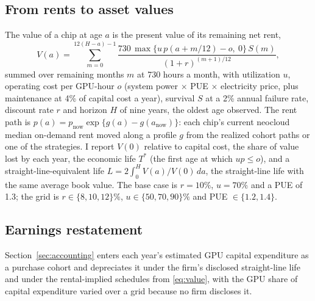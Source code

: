 \subsection{From rents to asset values}

The value of a chip at age $a$ is the present value of its remaining net rent,
\begin{equation}
V(a) = \sum_{m = 0}^{12(H - a) - 1} \frac{730 \, \max\{u\,p(a + m/12) - o,\ 0\} \, S(m)}{(1+r)^{(m+1)/12}},
\label{eq:value}
\end{equation}
summed over remaining months $m$ at 730 hours a month, with utilization $u$, operating cost per GPU-hour $o$ (system
power $\times$ PUE $\times$ electricity price, plus maintenance at 4\% of capital cost a year),
survival $S$ at a 2\% annual failure rate, discount rate $r$ and horizon $H$ of nine years, the
oldest age observed. The rent path is $p(a) = p_{\text{now}} \exp\{g(a) - g(a_{\text{now}})\}$:
each chip's current neocloud median on-demand rent moved along a profile $g$ from the realized
cohort paths or one of the strategies. I report $V(0)$ relative to capital cost, the share of value
lost by each year, the economic life $T^*$ (the first age at which $u p \le o$), and a
straight-line-equivalent life $L = 2\int_0^H V(a)/V(0)\,da$, the straight-line life with the same
average book value. The base case is $r = 10\%$, $u = 70\%$ and a PUE of 1.3; the grid is
$r \in \{8, 10, 12\}\%$, $u \in \{50, 70, 90\}\%$ and PUE $\in \{1.2, 1.4\}$.

\subsection{Earnings restatement}

Section~\ref{sec:accounting} enters each year's estimated GPU capital expenditure as a purchase
cohort and depreciates it under the firm's disclosed straight-line life and under the
rental-implied schedules from \eqref{eq:value}, with the GPU share of capital expenditure varied
over a grid because no firm discloses it.

